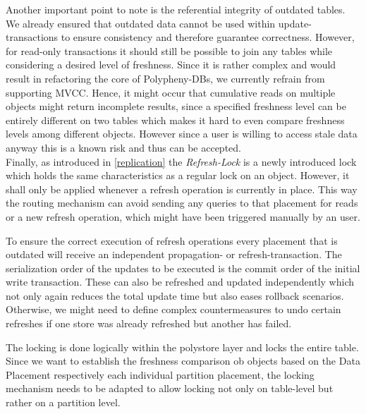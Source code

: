 Another important point to note is the referential integrity of outdated tables. We already ensured that outdated data cannot be used within update-transactions to 
ensure consistency and therefore guarantee correctness. However, for read-only transactions it should still be possible to join any tables while considering 
a desired level of freshness. 
Since it is rather complex and would result in refactoring the core of Polypheny-DBs, we currently refrain from supporting MVCC.
Hence, it might occur that cumulative reads on multiple objects might return incomplete results, since a specified freshness
level can be entirely different on two tables which makes it hard to even compare freshness levels among different objects. However since a user is willing to access 
stale data anyway this is a known risk and thus can be accepted.\\

Finally, as introduced in \ref{replication} the \emph{Refresh-Lock} is a newly introduced lock which holds the same characteristics as a regular lock on an object.
However, it shall only be applied whenever a refresh operation is currently in place. This way the routing mechanism can avoid sending any queries to that placement
for reads or a new refresh operation, which might have been triggered manually by an user.

To ensure the correct execution of refresh operations every placement that is outdated will receive an independent propagation- or refresh-transaction.
The serialization order of the updates to be executed is the commit order of the initial write transaction.
These can also be refreshed and updated independently which not only again reduces the total update time but also eases rollback scenarios.
Otherwise, we might need to define complex countermeasures to undo certain refreshes if one store was already refreshed but another has failed.


The locking is done logically within the polystore layer and locks the entire table.
Since we want to establish the freshness comparison ob objects based on the Data Placement respectively each individual partition placement, the locking mechanism
needs to be adapted to allow locking not only on table-level but rather on a partition level. 


